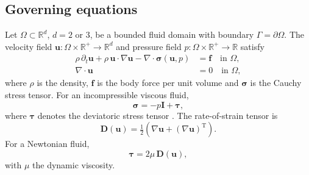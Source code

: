 \documentclass[lineno]{jfm}
\begin{document}
\subsection{Governing equations}
Let $\Omega\subset\mathbb{R}^{d}$, $d=2$ or $3$, be a bounded fluid domain
with boundary $\Gamma=\partial\Omega$. The velocity field
$\boldsymbol{u}:\Omega\times\mathbb{R}^{+}\rightarrow\mathbb{R}^{d}$ and
pressure field
$p:\Omega\times\mathbb{R}^{+}\rightarrow\mathbb{R}$ satisfy
\begin{align}
\rho\,\partial_t\boldsymbol{u}
+\rho\,\boldsymbol{u}\cdot\nabla\boldsymbol{u}
-\nabla\cdot\boldsymbol{\sigma}(\boldsymbol{u},p)
&=\boldsymbol{f}
\quad \text{in } \Omega,
\label{eq:fluid-general-a}\\
\nabla\cdot\boldsymbol{u}
&=0
\quad \text{in } \Omega,
\label{eq:fluid-general-b}
\end{align}
where $\rho$ is the density, $\boldsymbol{f}$ is the body force per unit volume
and $\boldsymbol{\sigma}$ is the Cauchy stress tensor. For an incompressible
viscous fluid,
\begin{equation}
\boldsymbol{\sigma}
=
-p\boldsymbol{I}
+\boldsymbol{\tau},
\label{eq:cauchy-stress}
\end{equation}
where $\boldsymbol{\tau}$ denotes the deviatoric stress tensor
\citep{SPENCER-DOVER,Sequeria2018}. The rate-of-strain tensor is
\begin{equation}
\boldsymbol{D}(\boldsymbol{u})
=
\tfrac{1}{2}
\left(
\nabla\boldsymbol{u}
+
(\nabla\boldsymbol{u})^{\mathrm{T}}
\right).
\label{eq:rate-strain}
\end{equation}
For a Newtonian fluid,
\begin{equation}
\boldsymbol{\tau}
=
2\mu\,\boldsymbol{D}(\boldsymbol{u}),
\label{eq:tau-newtonian}
\end{equation}
with $\mu$ the dynamic viscosity.
\end{document}
